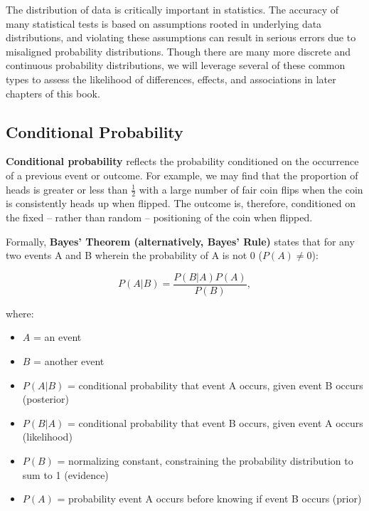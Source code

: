 \documentclass[
]{book}
\providecommand{\tightlist}{%
  \setlength{\itemsep}{0pt}\setlength{\parskip}{0pt}}
\begin{document}
The distribution of data is critically important in statistics. The accuracy of many statistical tests is based on assumptions rooted in underlying data distributions, and violating these assumptions can result in serious errors due to misaligned probability distributions. Though there are many more discrete and continuous probability distributions, we will leverage several of these common types to assess the likelihood of differences, effects, and associations in later chapters of this book.

\hypertarget{conditional-probability}{%
\subsection{Conditional Probability}\label{conditional-probability}}

\textbf{Conditional probability} reflects the probability conditioned on the occurrence of a previous event or outcome. For example, we may find that the proportion of heads is greater or less than \(\frac{1}{2}\) with a large number of fair coin flips when the coin is consistently heads up when flipped. The outcome is, therefore, conditioned on the fixed -- rather than random -- positioning of the coin when flipped.

Formally, \textbf{Bayes' Theorem (alternatively, Bayes' Rule)} states that for any two events A and B wherein the probability of A is not 0 (\(P(A) \neq 0\)):

\[ P(A \vert B) = \frac{P(B \vert A) P(A)}{P(B)}, \]

where:

\begin{itemize}
\tightlist
\item
  \(A\) = an event
\item
  \(B\) = another event
\item
  \(P(A|B)\) = conditional probability that event A occurs, given event B occurs (posterior)
\item
  \(P(B|A)\) = conditional probability that event B occurs, given event A occurs (likelihood)
\item
  \(P(B)\) = normalizing constant, constraining the probability distribution to sum to 1 (evidence)
\item
  \(P(A)\) = probability event A occurs before knowing if event B occurs (prior)
\end{itemize}
\end{document}
